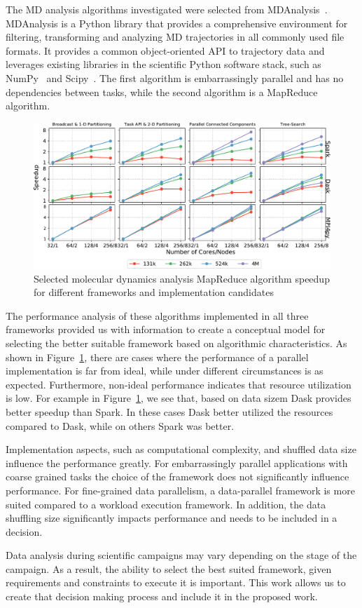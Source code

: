The MD analysis algorithms investigated were selected from 
MDAnalysis~\cite{gowers2016mdanalysis,michaud2011mdanalysis}. MDAnalysis is a 
Python library that provides a comprehensive environment for filtering, 
transforming and analyzing MD trajectories in all commonly used file formats. It 
provides a common object-oriented API to trajectory data and leverages existing 
libraries in the scientific Python software stack, such as NumPy~\cite{numpy} 
and Scipy~\cite{scipy}. The first algorithm is embarrassingly parallel and has 
no dependencies between tasks, while the second algorithm is a MapReduce 
algorithm.

\begin{figure}[t]
    \centering
    \includegraphics[width=.95\textwidth]{figures/All4approachesWith4MSpeedup.pdf}
    \caption{Selected molecular dynamics analysis MapReduce algorithm speedup 
    for different frameworks and implementation candidates}\label{fig:leafletfinder}
\end{figure}

The performance analysis of these algorithms implemented in all three frameworks 
provided us with information to create a conceptual model for selecting the 
better suitable framework based on algorithmic characteristics. As shown in 
Figure~\ref{fig:leafletfinder}, there are cases where the performance of a 
parallel implementation is far from ideal, while under different circumstances 
is as expected. Furthermore, non-ideal performance indicates that resource 
utilization is low. For example in Figure~\ref{fig:leafletfinder}, we see that, 
based on data sizem Dask provides better speedup than Spark. In these cases Dask 
better utilized the resources compared to Dask, while on others Spark was 
better.

Implementation aspects, such as computational complexity, and shuffled data 
size influence the performance greatly. For embarrassingly parallel 
applications with coarse grained tasks the choice of the framework does not 
significantly influence performance. For fine-grained data parallelism, a 
data-parallel framework is more suited compared to a workload execution 
framework. In addition, the data shuffling size significantly impacts 
performance and needs to be included in a decision.

Data analysis during scientific campaigns may vary depending on the stage of 
the campaign. As a result, the ability to select the best suited framework, 
given requirements and constraints to execute it is important. This work allows 
us to create that decision making process and include it in the proposed work.
